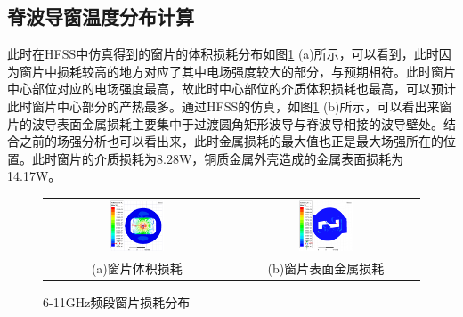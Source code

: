 \documentclass[master]{thesis-uestc}
\begin{document}
\subsection{脊波导窗温度分布计算}
此时在HFSS中仿真得到的窗片的体积损耗分布如图\ref{fig:X频段窗损耗分布图} (a)所示，可以看到，此时因为窗片中损耗较高的地方对应了其中电场强度较大的部分，与预期相符。此时窗片中心部位对应的电场强度最高，故此时中心部位的介质体积损耗也最高，可以预计此时窗片中心部分的产热最多。通过HFSS的仿真，如图\ref{fig:X频段窗损耗分布图} (b)所示，可以看出来窗片的波导表面金属损耗主要集中于过渡圆角矩形波导与脊波导相接的波导壁处。结合之前的场强分析也可以看出来，此时金属损耗的最大值也正是最大场强所在的位置。此时窗片的介质损耗为8.28W，铜质金属外壳造成的金属表面损耗为14.17W。
\begin{figure}[!htb]
    \small
    \centering
    \begin{tabular}{@{\ }c@{\ }c}
        \includegraphics[width=0.3\textwidth]{pic/chapter3/X频段窗片体积损耗.png} & 
        \hspace{5pt}
        \includegraphics[width=0.3\textwidth]{pic/chapter3/X频段波导表面损耗.png}     \\
        \mbox{\small (a)窗片体积损耗}                                                                               & 
        \mbox{\small (b)窗片表面金属损耗}                                                                                  \\
    \end{tabular}
    \caption{6-11GHz频段窗片损耗分布}
    \label{fig:X频段窗损耗分布图}
\end{figure}
\end{document}
